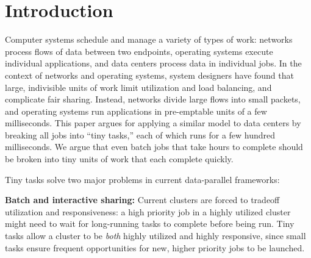 \section{Introduction}
Computer systems schedule and manage a variety of types of work:
networks process flows of data
between two endpoints, operating systems execute individual applications, and
data centers process data in individual jobs.  In the context of networks and
operating systems, system designers have found that large, indivisible units of work limit utilization and load balancing,
and complicate fair sharing.  Instead, networks divide large flows into small
packets, and operating systems run applications in pre-emptable units of a
few milliseconds.  This paper argues for
applying a similar model to data centers by breaking all jobs into
``tiny tasks,'' each of which runs for a few hundred
milliseconds. We argue that even batch jobs that take hours to complete
should be broken into tiny units of work that each complete quickly.

Tiny tasks solve two major problems in current data-parallel frameworks:

\vspace{4pt}\noindent\textbf{Batch and interactive sharing:}
Current clusters are forced to tradeoff utilization and responsiveness:
a high priority job in a highly utilized cluster might
need to wait for long-running tasks to complete before being run.
Tiny tasks allow a cluster to be \emph{both} highly utilized and highly
responsive, since small tasks ensure frequent opportunities for new,
higher priority jobs to be launched.

